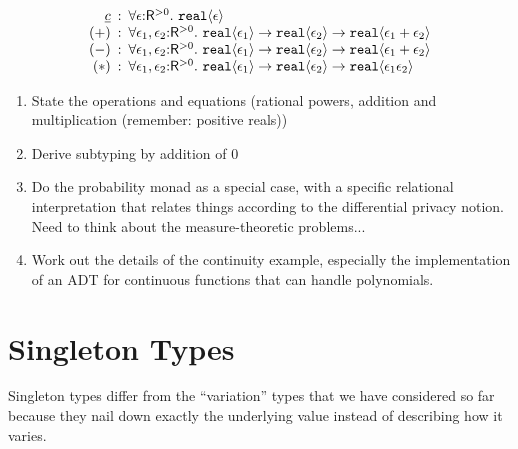 \begin{displaymath}
  \begin{array}{r@{\hspace{0.5em}:\hspace{0.5em}}l}
    \underline{c} & \forall \epsilon\mathord:\mathsf{R}^{>0}.\ \tyPrim{real}{\epsilon} \\
    (+) & \forall \epsilon_1, \epsilon_2\mathord:\mathsf{R}^{>0}.\ \tyPrim{real}{\epsilon_1} \to \tyPrim{real}{\epsilon_2} \to \tyPrim{real}{\epsilon_1 + \epsilon_2} \\
    (-) & \forall \epsilon_1, \epsilon_2\mathord:\mathsf{R}^{>0}.\ \tyPrim{real}{\epsilon_1} \to \tyPrim{real}{\epsilon_2} \to \tyPrim{real}{\epsilon_1 + \epsilon_2} \\
    (*) & \forall \epsilon_1, \epsilon_2\mathord:\mathsf{R}^{>0}.\ \tyPrim{real}{\epsilon_1} \to \tyPrim{real}{\epsilon_2} \to \tyPrim{real}{\epsilon_1\epsilon_2}
  \end{array}
\end{displaymath}

\begin{enumerate}
\item State the operations and equations (rational powers, addition
  and multiplication (remember: positive reals))
\item Derive subtyping by addition of $0$
\item Do the probability monad as a special case, with a specific
  relational interpretation that relates things according to the
  differential privacy notion. Need to think about the
  measure-theoretic problems...
\item Work out the details of the continuity example, especially the
  implementation of an ADT for continuous functions that can handle
  polynomials.
\end{enumerate}

\section{Singleton Types}
\label{sec:singleton-types}

\newcommand{\Sing}{\mathit{Sing}}

Singleton types differ from the ``variation'' types that we have
considered so far because they nail down exactly the underlying value
instead of describing how it varies.

